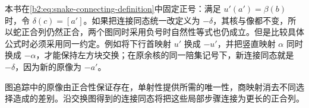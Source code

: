 \ProseParagraphBreak
本书在\eqref{b2:eq:snake-connecting-definition}中固定正号：满足 \(u'(a')=\beta(b)\) 时，令 \(\delta(c)=[a']\)。如果把连接同态统一改定义为 \(-\delta\)，其核与像都不变，所以蛇正合列仍然正合，两个图同时采用负号时自然性等式也仍成立。但是比较具体公式时必须采用同一约定。例如将下行首映射 \(u'\) 换成 \(-u'\)，并把竖直映射 \(\alpha\) 同时换成 \(-\alpha\)，才能保持左方块交换；在原余核的同一陪集记号下，新连接同态就是 \(-\delta\)，因为新的原像为 \(-a'\)。

\ProseParagraphBreak
图追踪中的原像由正合性保证存在，单射性提供所需的唯一性，商映射消去不同选择造成的差别。沿交换图得到的连接同态将把这些局部步骤连接为更长的正合列。
